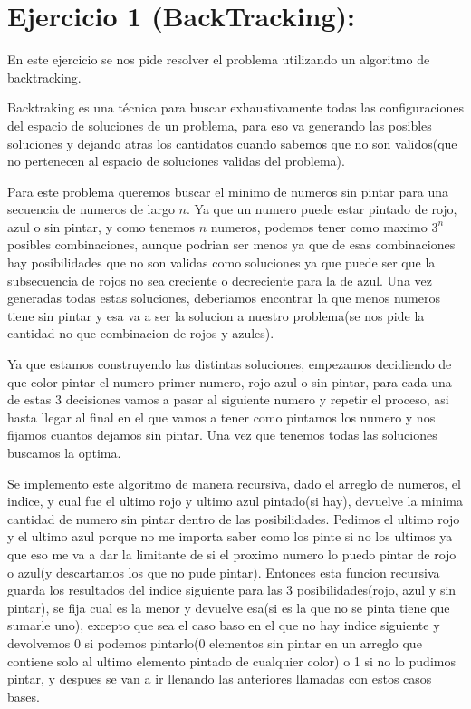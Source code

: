 \section{Ejercicio 1 (BackTracking):}

En este ejercicio se nos pide resolver el problema utilizando un algoritmo de backtracking.

Backtraking es una técnica para buscar exhaustivamente todas las configuraciones del espacio de soluciones de un problema, para eso va generando las posibles soluciones y dejando atras los cantidatos cuando sabemos que no son validos(que no pertenecen al espacio de soluciones validas del problema).

Para este problema queremos buscar el minimo de numeros sin pintar para una secuencia de numeros de largo $n$. Ya que un numero puede estar pintado de rojo, azul o sin pintar, y como tenemos $n$ numeros, podemos tener como maximo $3^n$ posibles combinaciones, aunque podrian ser menos ya que de esas combinaciones hay posibilidades que no son validas como soluciones ya que puede ser que la subsecuencia de rojos no sea creciente o decreciente para la de azul. Una vez generadas todas estas soluciones, deberiamos encontrar la que menos numeros tiene sin pintar y esa va a ser la solucion a nuestro problema(se nos pide la cantidad no que combinacion de rojos y azules).

Ya que estamos construyendo las distintas soluciones, empezamos decidiendo de que color pintar el numero primer numero, rojo azul o sin pintar, para cada una de estas 3 decisiones vamos a pasar al siguiente numero y repetir el proceso, asi hasta llegar al final en el que vamos a tener como pintamos los numero y nos fijamos cuantos dejamos sin pintar. Una vez que tenemos todas las soluciones buscamos la optima.

Se implemento este algoritmo de manera recursiva, dado el arreglo de numeros, el indice, y cual fue el ultimo rojo y ultimo azul pintado(si hay), devuelve la minima cantidad de numero sin pintar dentro de las posibilidades. Pedimos el ultimo rojo y el ultimo azul porque no me importa saber como los pinte si no los ultimos ya que eso me va a dar la limitante de si el proximo numero lo puedo pintar de rojo o azul(y descartamos los que no pude pintar). Entonces esta funcion recursiva guarda los resultados del indice siguiente para las 3 posibilidades(rojo, azul y sin pintar), se fija cual es la menor y devuelve esa(si es la que no se pinta tiene que sumarle uno), excepto que sea el caso baso en el que no hay indice siguiente y devolvemos 0 si podemos pintarlo(0 elementos sin pintar en un arreglo que contiene solo al ultimo elemento pintado de cualquier color) o 1 si no lo pudimos pintar, y despues se van a ir llenando las anteriores llamadas con estos casos bases.

